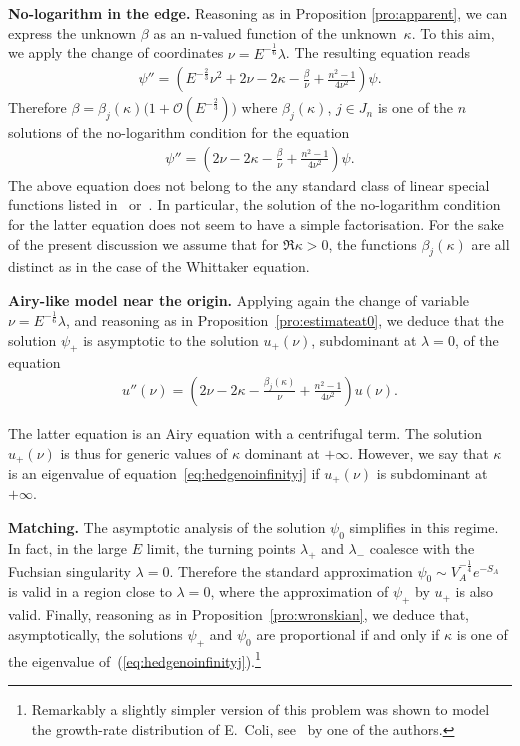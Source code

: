 \documentclass[pdftex]{sigma}
\numberwithin{equation}{section}
\newcommand{\la}{\lambda}
\begin{document}
{\bf No-logarithm in the edge.} Reasoning as in Proposition \ref{pro:apparent}, we can express the unknown $\beta$ as an n-valued function of the unknown~$\kappa$. To this aim, we apply the change of coordinates $\nu=E^{-\frac16} \la$. The resulting equation reads
\begin{gather*}%
\psi''= \left(E^{-\frac23}\nu^2 + 2 \nu-2\kappa - \frac{\beta}{\nu} + \frac{n^2-1}{4 \nu^2}\right) \psi .
\end{gather*}
Therefore $\beta=\beta_j(\kappa) \big(1+\mathcal{O}(E^{-\frac23})\big)$ where $\beta_j (\kappa)$, $j \in J_n $ is one of the $n$ solutions of the no-logarithm condition for the equation
\begin{gather}\label{eq:hedgenoinfinity}
\psi''= \left( 2 \nu-2\kappa - \frac{\beta}{\nu} + \frac{n^2-1}{4 \nu^2}
\right) \psi .
\end{gather}
The above equation does not belong to the any standard class of linear special functions listed in~\cite{nist} or~\cite{bateman2}. In particular, the solution of the no-logarithm condition for the latter equation does not seem to have a simple factorisation. For the sake of the present discussion we assume that for $\Re \kappa>0$, the functions $\beta_j(\kappa)$ are all distinct as in the case of the Whittaker equation.

{\bf Airy-like model near the origin.} Applying again the change of variable $\nu=E^{-\frac16} \la$, and reasoning as in Proposition~\ref{pro:estimateat0}, we deduce that the solution $\psi_+$ is asymptotic to the solution $u_+(\nu)$, subdominant at $\lambda=0$, of the equation
\begin{gather}\label{eq:hedgenoinfinityj}
u''(\nu)= \left( 2 \nu-2\kappa - \frac{\beta_j(\kappa)}{\nu} + \frac{n^2-1}{4 \nu^2}\right) u(\nu) .
\end{gather}

The latter equation is an Airy equation with a centrifugal term. The solution $u_+(\nu)$ is thus for generic values of $\kappa$
dominant at $+\infty$. However, we say that $\kappa$ is an eigenvalue of equation~\eqref{eq:hedgenoinfinityj} if
$u_+(\nu)$ is subdominant at~$+\infty$.

{\bf Matching.} The asymptotic analysis of the solution $\psi_0$ simplif\/ies in this regime. In fact, in the large $E$ limit, the turning points $\la_+$ and $\la_-$ coalesce with the Fuchsian singularity $\la=0$. Therefore the standard approximation $\psi_0\sim V_A^{-\frac14}e^{-S_A}$ is valid in a region close to $\la=0$, where the approximation of $\psi_+$ by $u_+$ is also valid. Finally, reasoning as in Proposition~\ref{pro:wronskian}, we deduce that, asymptotically,
the solutions $\psi_+$ and $\psi_0$ are proportional if and only if $\kappa$ is one of the eigenvalue of~(\ref{eq:hedgenoinfinityj}).\footnote{Remarkably a slightly simpler version of this problem was shown to 	model the growth-rate distribution of E.~Coli, see~\cite{cinese1} by one of the authors.}
\end{document}
